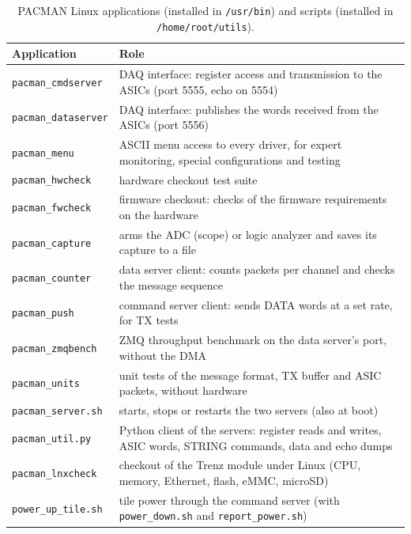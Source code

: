 \documentclass[12pt]{article}
\begin{document}
\begin{table}
\caption{\label{tbl:apps} PACMAN Linux applications (installed in \texttt{/usr/bin}) and scripts
  (installed in \texttt{/home/root/utils}).}
\begin{center}
\begin{tabular}{l>{\raggedright\arraybackslash}p{12cm}}
Application & Role \\
\hline
\texttt{pacman\_cmdserver}  & DAQ interface:  register access and transmission to the ASICs (port 5555, echo on 5554) \\
\texttt{pacman\_dataserver} & DAQ interface:  publishes the words received from the ASICs (port 5556) \\
\texttt{pacman\_menu}       & ASCII menu access to every driver, for expert monitoring, special configurations and testing \\
\texttt{pacman\_hwcheck}    & hardware checkout test suite \\
\texttt{pacman\_fwcheck}    & firmware checkout:  checks of the firmware requirements on the hardware \\
\texttt{pacman\_capture}    & arms the ADC (scope) or logic analyzer and saves its capture to a file \\
\texttt{pacman\_counter}    & data server client:  counts packets per channel and checks the message sequence \\
\texttt{pacman\_push}       & command server client:  sends DATA words at a set rate, for TX tests \\
\texttt{pacman\_zmqbench}   & ZMQ throughput benchmark on the data server's port, without the DMA \\
\texttt{pacman\_units}      & unit tests of the message format, TX buffer and ASIC packets, without hardware \\
\hline
\texttt{pacman\_server.sh}  & starts, stops or restarts the two servers (also at boot) \\
\texttt{pacman\_util.py}    & Python client of the servers:  register reads and writes, ASIC words, STRING commands, data and echo dumps \\
\texttt{pacman\_lnxcheck} & checkout of the Trenz module under Linux (CPU, memory, Ethernet, flash, eMMC, microSD) \\
\texttt{power\_up\_tile.sh}   & tile power through the command server (with \texttt{power\_down.sh} and
  \texttt{report\_power.sh}) \\
\end{tabular}
\end{center}
\end{table}
\end{document}
